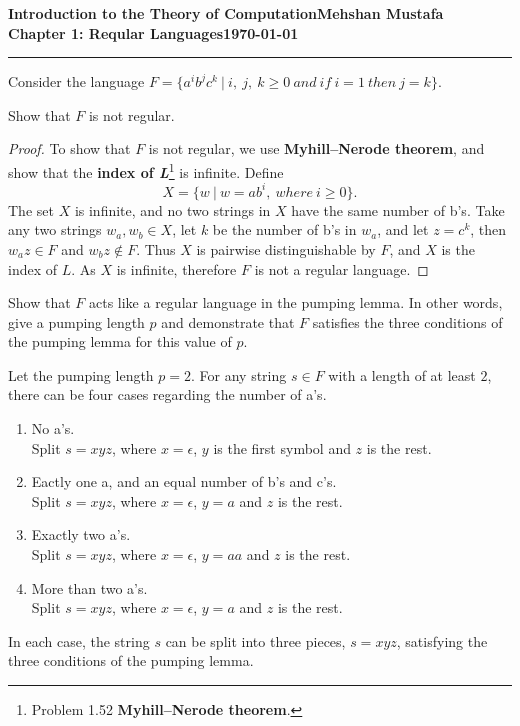 \documentclass[11pt]{article}
\newcommand{\myname}{Mehshan Mustafa}
\newcommand{\dated}{\today}
\newenvironment{problem}[2][Problem]{\begin{trivlist}
\item[\hskip \labelsep {\bfseries #1}\hskip \labelsep {\bfseries #2.}]}{\end{trivlist}}
\begin{document}
\textbf{Introduction to the Theory of
Computation}\hfill\textbf{\myname}\\[0.01in]
\textbf{Chapter 1: Reqular Languages}\hfill\textbf{\dated}\\
\smallskip\hrule\bigskip

\begin{problem}{1.54}
Consider the language $F = \{a^{i}b^{j}c^{k} \ | \ i, \ j, \ k \geq 0 \ and \ if \ i = 1 \ then \ j = k\}$.
\end{problem}

\begin{problem}[Part]{a}
Show that $F$ is not regular.
\end{problem}
\begin{proof}
To show that $F$ is not regular, we use \textbf{Myhill–Nerode theorem}, and show that the \textbf{index of \textit{L}}\footnote{Problem 1.52 \textbf{Myhill–Nerode theorem}.} is infinite. Define
\[ X = \{w \ | \ w = ab^{i}, \ where \ i \geq 0 \}. \]
The set $X$ is infinite, and no two strings in $X$ have the same number of b's. Take any two strings $w_{a}, w_{b} \in X$, let $k$ be the number of b's in $w_{a}$, and let $z = c^{k}$, then $w_{a}z \in F$ and $w_{b}z \notin F$. Thus $X$ is pairwise distinguishable by $F$, and $X$ is the index of $L$. As $X$ is infinite, therefore $F$ is not a regular language.
\end{proof}

\begin{problem}[Part]{b}
Show that $F$ acts like a regular language in the pumping lemma. In other
words, give a pumping length $p$ and demonstrate that $F$ satisfies the three conditions of the pumping lemma for this value of $p$.
\end{problem}
Let the pumping length $p=2$. For any string $s \in F$ with a length of at least $2$, there can be four cases regarding the number of a's.
\begin{enumerate}
\item No a's. \\
Split $s = xyz$, where $x = \epsilon$, $y$ is the first symbol and $z$ is the rest.
\item Eactly one a, and an equal number of b's and c's. \\
Split $s = xyz$, where $x = \epsilon$, $y = a$ and $z$ is the rest.
\item Exactly two a's. \\
Split $s = xyz$, where $x = \epsilon$, $y=aa$ and $z$ is the rest.
\item More than two a's. \\
Split $s = xyz$, where $x = \epsilon$, $y=a$ and $z$ is the rest.
\end{enumerate}
In each case, the string $s$ can be split into three pieces, $s = xyz$, satisfying the three conditions of the pumping lemma.
\end{document}
